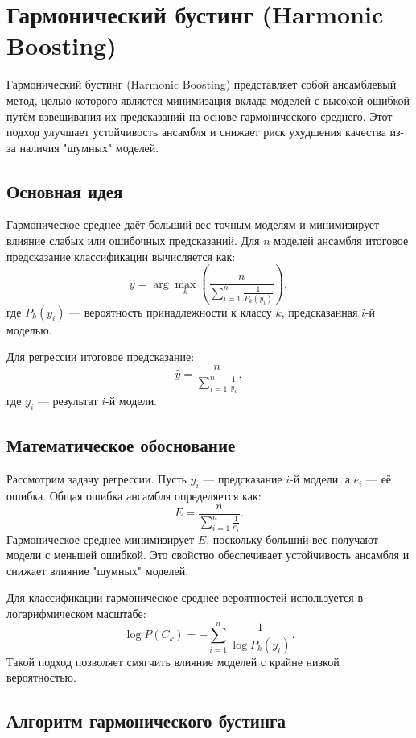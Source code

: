 \section*{Гармонический бустинг (Harmonic Boosting)}

Гармонический бустинг (Harmonic Boosting) представляет собой ансамблевый метод, целью которого является минимизация вклада моделей с высокой ошибкой путём взвешивания их предсказаний на основе гармонического среднего. Этот подход улучшает устойчивость ансамбля и снижает риск ухудшения качества из-за наличия "шумных" моделей.

\subsection*{Основная идея}

Гармоническое среднее даёт больший вес точным моделям и минимизирует влияние слабых или ошибочных предсказаний. Для \( n \) моделей ансамбля итоговое предсказание классификации вычисляется как:
\[
\hat{y} = \arg\max_{k} \left( \frac{n}{\sum_{i=1}^n \frac{1}{P_k(y_i)}} \right),
\]
где \( P_k(y_i) \) — вероятность принадлежности к классу \( k \), предсказанная \( i \)-й моделью.

Для регрессии итоговое предсказание:
\[
\hat{y} = \frac{n}{\sum_{i=1}^n \frac{1}{y_i}},
\]
где \( y_i \) — результат \( i \)-й модели.

\subsection*{Математическое обоснование}

Рассмотрим задачу регрессии. Пусть \( y_i \) — предсказание \( i \)-й модели, а \( e_i \) — её ошибка. Общая ошибка ансамбля определяется как:
\[
E = \frac{n}{\sum_{i=1}^n \frac{1}{e_i}}.
\]
Гармоническое среднее минимизирует \( E \), поскольку больший вес получают модели с меньшей ошибкой. Это свойство обеспечивает устойчивость ансамбля и снижает влияние "шумных" моделей.

Для классификации гармоническое среднее вероятностей используется в логарифмическом масштабе:
\[
\log P(C_k) = -\sum_{i=1}^n \frac{1}{\log P_k(y_i)}.
\]
Такой подход позволяет смягчить влияние моделей с крайне низкой вероятностью.

\subsection*{Алгоритм гармонического бустинга}

